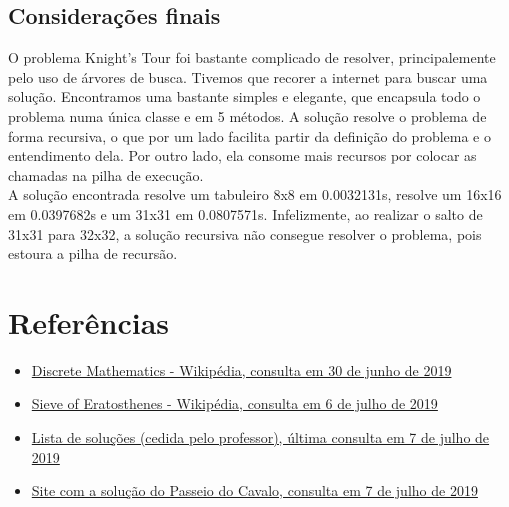 \documentclass{article}
\begin{document}
    \subsection{Considerações finais}
    O problema Knight's Tour foi bastante complicado de resolver, principalemente pelo uso de árvores de busca. Tivemos que recorer a internet para buscar uma solução. Encontramos uma bastante simples e elegante, que encapsula todo o problema numa única classe e em 5 métodos. A solução resolve o problema de forma recursiva, o que por um lado facilita partir da definição do problema e o entendimento dela. Por outro lado, ela consome mais recursos por colocar as chamadas na pilha de execução.\\
    A solução encontrada resolve um tabuleiro 8x8 em 0.0032131s, resolve um 16x16 em 0.0397682s e um 31x31 em 0.0807571s. Infelizmente, ao realizar o salto de 31x31 para 32x32, a solução recursiva não consegue resolver o problema, pois estoura a pilha de recursão.
\clearpage

\section{Referências}
    \begin{itemize}
      \item \href{https://en.wikipedia.org/wiki/Discrete_mathematics}{Discrete Mathematics - Wikipédia, consulta em 30 de junho de 2019}
      \item \href{https://en.wikipedia.org/wiki/Sieve_of_Eratosthenes}{Sieve of Eratosthenes - Wikipédia, consulta em 6 de julho de 2019}
      \item \href{https://github.com/nayuki/Project-Euler-solutions/blob/master/Answers.txt}{Lista de soluções (cedida pelo professor), última consulta em 7 de julho de 2019}
      \item \href{http://blog.justsophie.com/algorithm-for-knights-tour-in-python/}{Site com a solução do Passeio do Cavalo, consulta em 7 de julho de 2019}
    \end{itemize}
\end{document}

